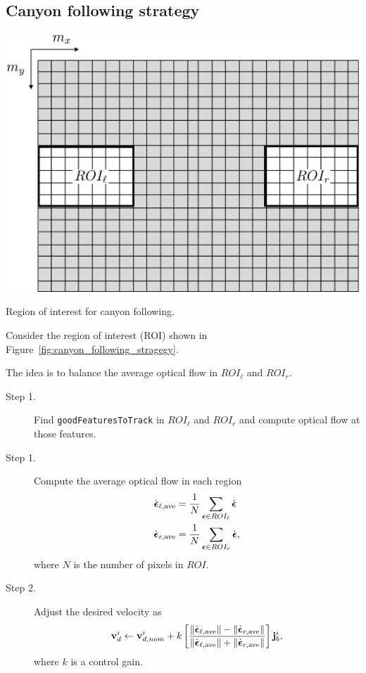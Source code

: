 \subsection{Canyon following strategy}


\begin{marginfigure}
	\includegraphics[width=\linewidth]{chap7_optical_flow/figures/canyon_following_strategy}
	\caption{Region of interest for canyon following.}
	\label{fig:canyon_following_stragegy}
\end{marginfigure}  

Consider the region of interest (ROI) shown in Figure~\ref{fig:canyon_following_stragegy}.

The idea is to balance the average optical flow in $ROI_\ell$ and $ROI_r$.

\begin{description}
	\item[Step 1.] Find \texttt{goodFeaturesToTrack} in $ROI_\ell$ and $ROI_r$ and compute optical flow at those features.
	\item[Step 1.]  Compute the average optical flow in each region
	\begin{align*}
		\dot{\boldsymbol{\epsilon}}_{\ell,\text{ave}} &= \frac{1}{N}\sum_{\boldsymbol{\epsilon}\in ROI_\ell} \dot{\boldsymbol{\epsilon}} \\
		\dot{\boldsymbol{\epsilon}}_{r,\text{ave}} &= \frac{1}{N}\sum_{\boldsymbol{\epsilon}\in ROI_r} \dot{\boldsymbol{\epsilon}},
	\end{align*}
	where $N$ is the number of pixels in $ROI$.
	\item[Step 2.] Adjust the desired velocity as
	\[
	\mathbf{v}_d^i \leftarrow \mathbf{v}_{d,nom}^i + k\left[\frac{\left\|\dot{\boldsymbol{\epsilon}}_{\ell,\text{ave}}\right\|-\left\|\dot{\boldsymbol{\epsilon}}_{r,\text{ave}}\right\|}{\left\|\dot{\boldsymbol{\epsilon}}_{\ell,\text{ave}}\right\|+\left\|\dot{\boldsymbol{\epsilon}}_{r,\text{ave}}\right\|}\right] \mathbf{j}_b^i,
	\]
	where $k$ is a control gain.
\end{description}

